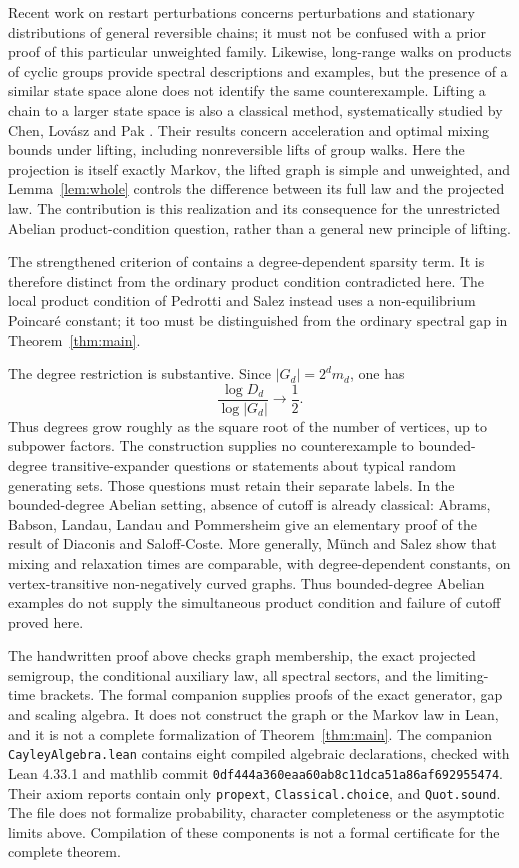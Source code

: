 \documentclass[11pt]{article}
\theoremstyle{remark}\newtheorem{remark}[theorem]{Remark}
\begin{document}
Recent work on restart perturbations \cite{Vial} concerns perturbations and stationary distributions of general reversible chains; it must not be confused with a prior proof of this particular unweighted family. Likewise, long-range walks on products of cyclic groups \cite{GM} provide spectral descriptions and examples, but the presence of a similar state space alone does not identify the same counterexample. Lifting a chain to a larger state space is also a classical method, systematically studied by Chen, Lov\'asz and Pak \cite{CLP}. Their results concern acceleration and optimal mixing bounds under lifting, including nonreversible lifts of group walks. Here the projection is itself exactly Markov, the lifted graph is simple and unweighted, and Lemma~\ref{lem:whole} controls the difference between its full law and the projected law. The contribution is this realization and its consequence for the unrestricted Abelian product-condition question, rather than a general new principle of lifting.

The strengthened criterion of \cite{SalezCurvature} contains a degree-dependent sparsity term. It is therefore distinct from the ordinary product condition contradicted here. The local product condition of Pedrotti and Salez \cite{PS} instead uses a non-equilibrium Poincar\'e constant; it too must be distinguished from the ordinary spectral gap in Theorem~\ref{thm:main}.

The degree restriction is substantive. Since $|G_d|=2^dm_d$, one has
\[
 \frac{\log D_d}{\log|G_d|}\longrightarrow\frac12.
\]
Thus degrees grow roughly as the square root of the number of vertices, up to subpower factors. The construction supplies no counterexample to bounded-degree transitive-expander questions or statements about typical random generating sets. Those questions must retain their separate labels. In the bounded-degree Abelian setting, absence of cutoff is already classical: Abrams, Babson, Landau, Landau and Pommersheim \cite{ABLLP} give an elementary proof of the result of Diaconis and Saloff-Coste. More generally, M\"unch and Salez \cite[Theorem 2]{MS} show that mixing and relaxation times are comparable, with degree-dependent constants, on vertex-transitive non-negatively curved graphs. Thus bounded-degree Abelian examples do not supply the simultaneous product condition and failure of cutoff proved here.

The handwritten proof above checks graph membership, the exact projected semigroup, the conditional auxiliary law, all spectral sectors, and the limiting-time brackets. The formal companion supplies proofs of the exact generator, gap and scaling algebra. It does not construct the graph or the Markov law in Lean, and it is not a complete formalization of Theorem~\ref{thm:main}. The companion \texttt{CayleyAlgebra.lean} contains eight compiled algebraic declarations, checked with Lean 4.33.1 and mathlib commit \texttt{0df444a360eaa60ab8c11dca51a86af692955474}. Their axiom reports contain only \texttt{propext}, \texttt{Classical.choice}, and \texttt{Quot.sound}. The file does not formalize probability, character completeness or the asymptotic limits above. Compilation of these components is not a formal certificate for the complete theorem.
\end{document}
